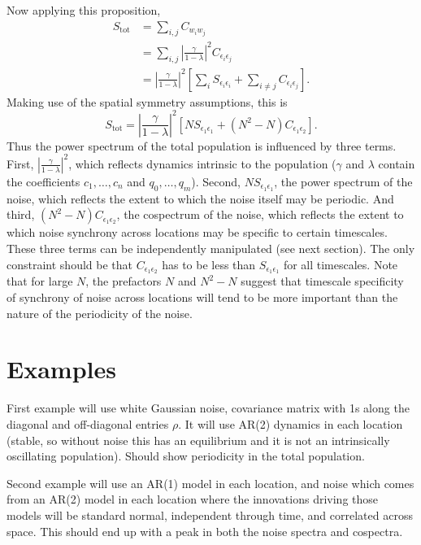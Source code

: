 \documentclass[letterpaper,11pt]{article}
\begin{document}
Now applying this proposition,
\begin{align}
S_{\text{tot}} &= \sum_{i,j} C_{w_i w_j} \\
&= \sum_{i,j} \left| \frac{\gamma}{1-\lambda} \right|^{ 2} C_{\epsilon_{i}\epsilon_{j}} \\
&= \left| \frac{\gamma}{1-\lambda} \right|^{ 2} \left[ \sum_i S_{\epsilon_{i}\epsilon_{i}} +\sum_{i \neq j} C_{\epsilon_{i}\epsilon_{j}}\right].
\end{align}
Making use of the spatial symmetry assumptions, this is
\begin{equation}
S_{\text{tot}} = \left| \frac{\gamma}{1-\lambda} \right|^{ 2} \left[ N S_{\epsilon_{ 1}\epsilon_{ 1}} + (N^2-N) C_{\epsilon_{ 1}\epsilon_{ 2}} \right].\label{eq:finalres}
\end{equation}
Thus the power spectrum of the total  population is influenced by three terms.
First, $\left| \frac{\gamma}{1-\lambda} \right|^{ 2}$, which reflects
dynamics intrinsic to the population ($\gamma$ and $\lambda$ contain 
the coefficients $c_1,\ldots,c_n$ and $q_0,\ldots,q_m$). Second, 
$N S_{\epsilon_{ 1}\epsilon_{ 1}}$, the  power
spectrum of the noise, which reflects the extent to which the noise
itself may be periodic. And third, $(N^2-N) C_{\epsilon_{ 1}\epsilon_{ 2}}$, 
the cospectrum of the noise, which reflects the extent to which noise
synchrony across locations may be specific to certain timescales.
These three terms can be independently manipulated (see next section). 
The only constraint should be that $C_{\epsilon_{ 1}\epsilon_{ 2}}$ has to be
less than $S_{\epsilon_{ 1}\epsilon_{ 1}}$ for all timescales. Note that for
large $N$, the prefactors $N$ and $N^2-N$ suggest that timescale specificity of
synchrony of noise across locations will tend to be more important than 
the nature of the periodicity of the noise.

\section{Examples}

First example will use white Gaussian noise, covariance matrix with 1s along 
the diagonal and off-diagonal entries $\rho$. It will use AR(2) dynamics in each
location (stable, so without noise this has an equilibrium and it is not an 
intrinsically oscillating population). Should show periodicity in the total
population.

Second example will use an AR(1) model in each location, and noise which comes
from an AR(2) model in each location where the innovations driving those models
will be standard normal, independent through time, and correlated across space.
This should end up with a peak in both the noise spectra and cospectra. 
\end{document}
